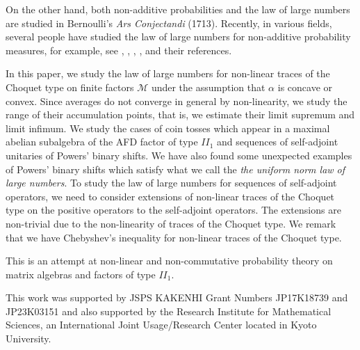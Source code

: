 \documentclass[a4paper,12pt]{amsart}
\newcommand{\M}{\mathcal{M}}
\begin{document}
On the other hand, both non-additive probabilities and the law of large numbers are studied in Bernoulli's 
{\it Ars Conjectandi} (1713).  Recently, in various fields,  several people have studied the law of large numbers for 
non-additive probability measures, for example, see \cite{chen}, \cite{M-M}, \cite{peng}, \cite{teran}, and 
their references. 

In this paper, we study the law of large numbers for non-linear traces of the Choquet type on finite factors $\M$ 
under the assumption that $\alpha$ is concave or convex. Since averages do not converge in general by non-linearity, 
we study the range of their accumulation points, that is, we estimate their limit supremum and limit infimum. We study the cases of coin tosses 
which appear in a maximal abelian subalgebra of the AFD factor of type $II_1$  and sequences of self-adjoint unitaries 
of Powers' binary shifts.   We have also found some unexpected examples of Powers' binary shifts which satisfy what we call 
the  {\it the uniform norm law of large numbers}.  To study the law of large numbers for sequences of self-adjoint operators, 
we need to consider extensions of non-linear traces of the Choquet type on the positive operators to the self-adjoint operators.  
The extensions are non-trivial due to the non-linearity of traces of the Choquet type.  We remark that we have Chebyshev's inequality for non-linear traces of the Choquet type.  

This is an attempt at non-linear and non-commutative probability theory on matrix algebras and factors of 
type $II_1$. 



\vspace{3mm}

This work was supported by JSPS KAKENHI Grant Numbers \linebreak
JP17K18739 and JP23K03151
and also supported by the Research Institute for Mathematical Sciences, an International Joint Usage/Research Center located in Kyoto University.


\end{document}
